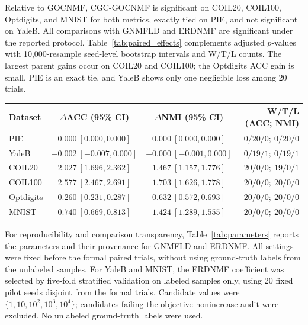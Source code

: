\documentclass[11pt]{article}
\newenvironment{widetable}
  {\begin{strip}\centering\captionsetup{type=table}}
  {\end{strip}}
\theoremstyle{remark}
\begin{document}
Relative to GOCNMF, CGC-GOCNMF is significant on COIL20, COIL100, Optdigits, and MNIST for both metrics, exactly tied on PIE, and not significant on YaleB. All comparisons with GNMFLD and ERDNMF are significant under the reported protocol. Table~\ref{tab:paired_effects} complements adjusted $p$-values with 10,000-resample seed-level bootstrap intervals and W/T/L counts. The largest parent gains occur on COIL20 and COIL100; the Optdigits ACC gain is small, PIE is an exact tie, and YaleB shows only one negligible loss among 20 trials.

\begin{widetable}
\centering
\caption{Paired changes of CGC-GOCNMF relative to GOCNMF. Values are mean percentage-point changes with seed-level percentile-bootstrap 95\% confidence intervals over 20 paired trials (10,000 resamples; MATLAB random seed 20261009). W/T/L denotes wins, exact ties, and losses.}
\label{tab:paired_effects}
\small
\setlength{\tabcolsep}{26.2pt}
\begin{tabular}{lccr}
\toprule
Dataset & $\Delta$ACC (95\% CI) & $\Delta$NMI (95\% CI) & W/T/L (ACC; NMI) \\
\midrule
PIE       & $0.000\ [0.000,0.000]$ & $0.000\ [0.000,0.000]$ & $0/20/0;\ 0/20/0$ \\
YaleB     & $-0.002\ [-0.007,0.000]$ & $-0.000\ [-0.001,0.000]$ & $0/19/1;\ 0/19/1$ \\
COIL20    & $2.027\ [1.696,2.362]$ & $1.467\ [1.157,1.776]$ & $20/0/0;\ 19/0/1$ \\
COIL100   & $2.577\ [2.467,2.691]$ & $1.703\ [1.626,1.778]$ & $20/0/0;\ 20/0/0$ \\
Optdigits & $0.260\ [0.231,0.287]$ & $0.632\ [0.572,0.693]$ & $20/0/0;\ 20/0/0$ \\
MNIST     & $0.740\ [0.669,0.813]$ & $1.424\ [1.289,1.555]$ & $20/0/0;\ 20/0/0$ \\
\bottomrule
\end{tabular}
\end{widetable}

For reproducibility and comparison transparency, Table~\ref{tab:parameters} reports the parameters and their provenance for GNMFLD and ERDNMF. All settings were fixed before the formal paired trials, without using ground-truth labels from the unlabeled samples. For YaleB and MNIST, the ERDNMF coefficient was selected by five-fold stratified validation on labeled samples only, using 20 fixed pilot seeds disjoint from the formal trials. Candidate values were $\{1,10,10^2,10^3,10^4\}$; candidates failing the objective nonincrease audit were excluded. No unlabeled ground-truth labels were used.
\end{document}
